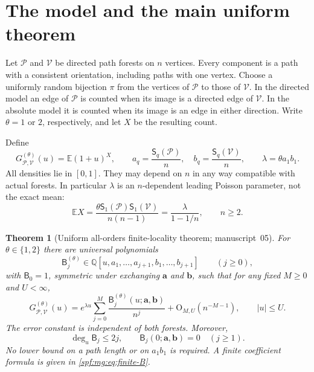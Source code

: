 \documentclass[11pt]{article}
\numberwithin{equation}{section}
\newtheorem{theorem}{Theorem}[section]
\theoremstyle{definition}
\theoremstyle{remark}
\theoremstyle{definition}
\newcommand{\E}{\mathbb E}
\newcommand{\Q}{\mathbb Q}
\newcommand{\bigO}{\mathrm O}
\newcommand{\mga}{\boldsymbol a}
\newcommand{\mgb}{\boldsymbol b}
\begin{document}
\section{The model and the main uniform theorem}
\label{spf:mg:sec:main}

Let $\mathcal P$ and $\mathcal V$ be directed path forests on $n$ vertices. Every
component is a path with a consistent orientation, including paths with
one vertex. Choose a uniformly random bijection $\pi$ from the vertices
of $\mathcal P$ to those of $\mathcal V$. In the directed model an edge of $\mathcal P$
is counted when its image is a directed edge of $\mathcal V$. In the absolute
model it is counted when its image is an edge in either direction. Write
$\theta=1$ or $2$, respectively, and let $X$ be the resulting count.

Define
\begin{equation}
 G_{\mathcal P,\mathcal V}^{(\theta)}(u)=\E(1+u)^X,
 \qquad
 a_q=\frac{\mathsf S_q(\mathcal P)}n,\quad b_q=\frac{\mathsf S_q(\mathcal V)}n,
 \qquad \lambda=\theta a_1b_1.
 \label{spf:mg:eq:model}
\end{equation}
All densities lie in $[0,1]$. They may depend on $n$ in any way compatible
with actual forests. In particular $\lambda$ is an $n$-dependent leading
Poisson parameter, not the exact mean:
\begin{equation}
 \E X=\frac{\theta \mathsf S_1(\mathcal P)\mathsf S_1(\mathcal V)}{n(n-1)}
       =\frac{\lambda}{1-1/n},\qquad n\ge2.
 \label{spf:mg:eq:exact-mean}
\end{equation}

\begin{theorem}[Uniform all-orders finite-locality theorem; manuscript~05]
\label{spf:mg:thm:main}
For $\theta\in\{1,2\}$ there are universal polynomials
\begin{equation}
 \mathsf B_j^{(\theta)}
 \in\Q[u,a_1,\ldots,a_{j+1},b_1,\ldots,b_{j+1}]
 \qquad(j\ge0),
 \label{spf:mg:eq:B-ring}
\end{equation}
with $\mathsf B_0=1$, symmetric under exchanging $\mga$ and $\mgb$, such that for
any fixed $M\ge0$ and $U<\infty$,
\begin{equation}
 G_{\mathcal P,\mathcal V}^{(\theta)}(u)
 =e^{\lambda u}\sum_{j=0}^{M}\frac{\mathsf B_j^{(\theta)}(u;\mga,\mgb)}{n^j}
   +\bigO_{M,U}(n^{-M-1}),\qquad |u|\le U.
 \label{spf:mg:eq:main}
\end{equation}
The error constant is independent of both forests. Moreover,
\begin{equation}
 \deg_u \mathsf B_j\le2j,
 \qquad \mathsf B_j(0;\mga,\mgb)=0\quad(j\ge1).
 \label{spf:mg:eq:degree}
\end{equation}
No lower bound on a path length or on $a_1b_1$ is required. A finite
coefficient formula is given in \cref{spf:mg:eq:finite-B}.
\end{theorem}
\end{document}
